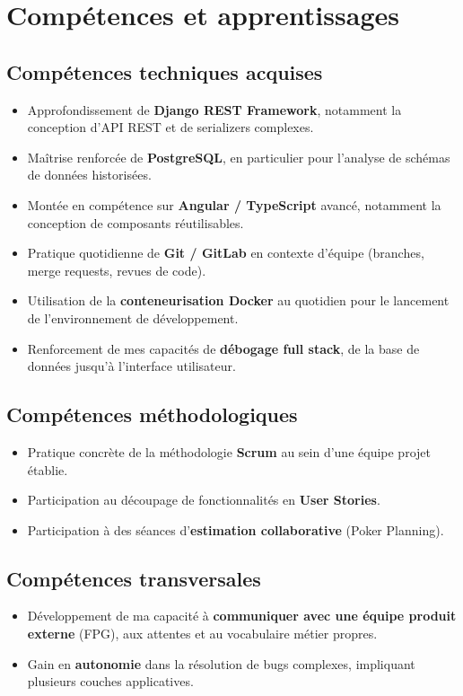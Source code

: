 
\chapter{Compétences et apprentissages}

\section{Compétences techniques acquises}

\begin{itemize}
  \item Approfondissement de \textbf{Django REST Framework}, notamment
        la conception d'API REST et de serializers complexes.
  \item Maîtrise renforcée de \textbf{PostgreSQL}, en particulier pour
        l'analyse de schémas de données historisées.
  \item Montée en compétence sur \textbf{Angular / TypeScript} avancé,
        notamment la conception de composants réutilisables.
  \item Pratique quotidienne de \textbf{Git / GitLab} en contexte
        d'équipe (branches, merge requests, revues de code).
  \item Utilisation de la \textbf{conteneurisation Docker} au quotidien
        pour le lancement de l'environnement de développement.
  \item Renforcement de mes capacités de \textbf{débogage full stack},
        de la base de données jusqu'à l'interface utilisateur.
\end{itemize}

\section{Compétences méthodologiques}

\begin{itemize}
  \item Pratique concrète de la méthodologie \textbf{Scrum} au sein
        d'une équipe projet établie.
  \item Participation au découpage de fonctionnalités en
        \textbf{User Stories}.
  \item Participation à des séances d'\textbf{estimation collaborative}
        (Poker Planning).
\end{itemize}

\section{Compétences transversales}

\begin{itemize}
  \item Développement de ma capacité à \textbf{communiquer avec une
        équipe produit externe} (FPG), aux attentes et au vocabulaire
        métier propres.
  \item Gain en \textbf{autonomie} dans la résolution de bugs complexes,
        impliquant plusieurs couches applicatives.
\end{itemize}
